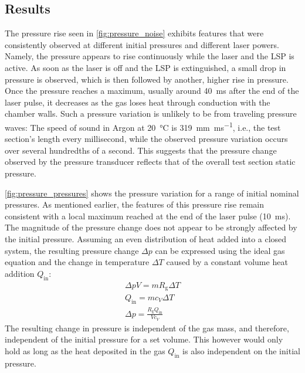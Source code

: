         \subsection{Results}
            The pressure rise seen in \autoref{fig:pressure_noise} exhibits features that were consistently observed at different initial pressures and different laser powers. Namely, the pressure appears to rise continuously while the laser and the LSP is active. As soon as the laser is off and the LSP is extinguished, a small drop in pressure is observed, which is then followed by another, higher rise in pressure. Once the pressure reaches a maximum, usually around \qty{40}{ms} after the end of the laser pulse, it decreases  as the gas loses heat through conduction with the chamber walls. Such a pressure variation is unlikely to be from traveling pressure waves: The speed of sound in Argon at \qty{20}{\degreeCelsius} is \qty{319}{mm.ms^{-1}}, i.e., the test section's length every millisecond, while the observed pressure variation occurs over several hundredths of a second. This suggests that the pressure change observed by the pressure transducer reflects that of the overall test section static pressure.

            \autoref{fig:pressure_pressures} shows the pressure variation for a range of initial nominal pressures. As mentioned earlier, the features of this pressure rise remain consistent with a local maximum reached at the end of the laser pulse (\qty{10}{ms}). The magnitude of the pressure change does not appear to be strongly affected by the initial pressure. Assuming an even distribution of heat added into a closed system, the resulting pressure change $\Delta p$ can be expressed using the ideal gas equation and the change in temperature $\Delta T$ caused by a constant volume heat addition $Q_\mathrm{in}$:
            \begin{gather*}
                \Delta pV = mR_\mathrm{g}\Delta T \\
                Q_\mathrm{in} = mc_V\Delta T \\
                \Delta p = \frac{R_\mathrm{g}Q_\mathrm{in}}{Vc_V}
            \end{gather*}
            The resulting change in pressure is independent of the gas mass, and therefore, independent of the initial pressure for a set volume. This however would only hold as long as the heat deposited in the gas $Q_\mathrm{in}$ is also independent on the initial pressure.

